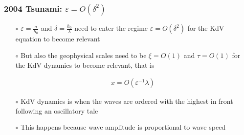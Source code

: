 \documentclass[fleqn]{beamer}
\begin{document}
    \begin{frame}
        \frametitle{2004 Tsunami: $\varepsilon=O\left(\delta^2\right)$}

        \begin{itemize}
            \item[$\circ$] $\varepsilon = \frac{a}{h_0}$ and $\delta =
                \frac{h_0}{\lambda}$ need to enter the regime
                $\varepsilon=O(\delta^2)$ for the KdV equation to become
                relevant
            \item[$\circ$] But also the geophysical scales need to be $\xi = O(1)$ and $\tau =
                O(1)$ for the KdV dynamics to become relevant, that is
                \begin{ceqn}
                \begin{align}
                    x = O\left(\varepsilon^{-1} \lambda \right)
                \end{align}
                \end{ceqn}
            \item[$\circ$] KdV dynamics is when the waves are ordered with the
                highest in front following an oscillatory tale
            \item[$\circ$] This happens because wave amplitude is proportional to
                wave speed
        \end{itemize}

    \end{frame}
\end{document}
